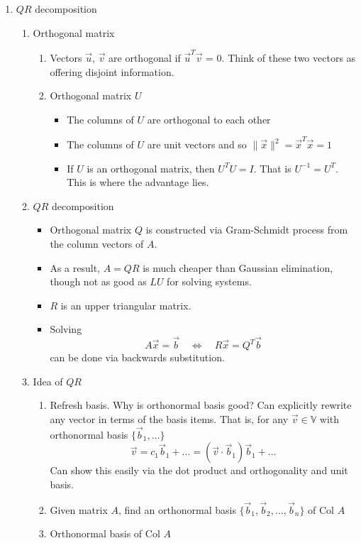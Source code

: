 \documentclass{article}
\theoremstyle{remark}
\begin{document}
\begin{enumerate}
\item $QR$ decomposition
\begin{enumerate}
\item Orthogonal matrix
\begin{enumerate}
\item Vectors $\vec u$, $\vec v$ are orthogonal if  $\vec u^T \vec v$ = 0. Think of these two vectors as offering disjoint information.
\item Orthogonal matrix $U$
\begin{itemize}
\item The columns of $U$ are orthogonal to each other
\item The columns of $U$ are unit vectors and so $\|\vec{x}\|^2 = \vec{x}^T \vec{x} = 1$
\item If $U$ is an orthogonal matrix, then $U^TU = I$. That is $U^{-1} = U^T$. This is where the advantage lies.
\end{itemize}
\end{enumerate}
\item $QR$ decomposition
\begin{itemize}
\item Orthogonal matrix $Q$ is constructed via Gram-Schmidt process from the column vectors of $A$.
\item As a result, $A=QR$ is much cheaper than Gaussian elimination, though not as good as $LU$ for solving systems.
\item $R$ is an upper triangular matrix.
\item Solving 
$$
A\vec x = \vec b\quad \Leftrightarrow\quad R\vec x = Q^T\vec b
$$
can be done via backwards substitution.
\end{itemize}
\item Idea of $QR$
\begin{enumerate}
\item Refresh basis. Why is orthonormal basis good? Can explicitly rewrite any vector in terms of the basis items. That is, for any $\vec{v} \in \mathbb{V}$ with orthonormal basis $\{ \vec{b}_1, \dots \}$
\[
\vec{v}  = c_1 \vec{b}_1 + \dots = \left(\vec{v}\cdot \vec{b}_1\right) \vec{b}_1 + \dots
\]
Can show this easily via the dot product and orthogonality and unit basis.
\item Given matrix $A$, find an orthonormal basis $\{\vec b_1, \vec b_2,...,\vec b_n\}$ of Col $A$
\item Orthonormal basis of Col $A$

\end{enumerate}
\end{enumerate}
\end{enumerate}
\end{document}
